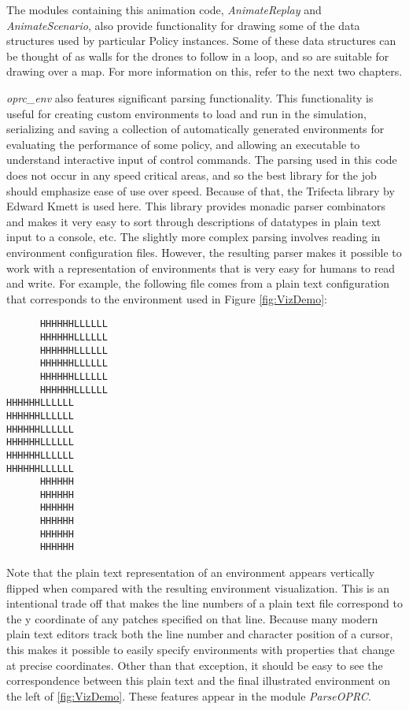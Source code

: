 The modules containing this animation code, \textit{AnimateReplay} and \textit{AnimateScenario}, also provide functionality for drawing some of the data structures used by particular Policy instances. Some of these data structures can be thought of as walls for the drones to follow in a loop, and so are suitable for drawing over a map. For more information on this, refer to the next two chapters.

\textit{oprc\_env} also features significant parsing functionality. This functionality is useful for creating custom environments to load and run in the simulation, serializing and saving a collection of automatically generated environments for evaluating the performance of some policy, and allowing an executable to understand interactive input of control commands. The parsing used in this code does not occur in any speed critical areas, and so the best library for the job should emphasize ease of use over speed. Because of that, the Trifecta library by Edward Kmett is used here. This library provides monadic parser combinators and makes it very easy to sort through descriptions of datatypes in plain text input to a console, etc. The slightly more complex parsing involves reading in environment configuration files. However, the resulting parser makes it possible to work with a representation of environments that is very easy for humans to read and write. For example, the following file comes from a plain text configuration that corresponds to the environment used in Figure \ref{fig:VizDemo}:

\begin{verbatim}
      HHHHHHLLLLLL
      HHHHHHLLLLLL
      HHHHHHLLLLLL
      HHHHHHLLLLLL
      HHHHHHLLLLLL
      HHHHHHLLLLLL
HHHHHHLLLLLL      
HHHHHHLLLLLL      
HHHHHHLLLLLL      
HHHHHHLLLLLL      
HHHHHHLLLLLL      
HHHHHHLLLLLL      
      HHHHHH      
      HHHHHH      
      HHHHHH      
      HHHHHH      
      HHHHHH      
      HHHHHH      
\end{verbatim}

Note that the plain text representation of an environment appears vertically flipped when compared with the resulting environment visualization. This is an intentional trade off that makes the line numbers of a plain text file correspond to the y coordinate of any patches specified on that line. Because many modern plain text editors track both the line number and character position of a cursor, this makes it possible to easily specify environments with properties that change at precise coordinates. Other than that exception, it should be easy to see the correspondence between this plain text and the final illustrated environment on the left of \ref{fig:VizDemo}. These features appear in the module \textit{ParseOPRC}.

